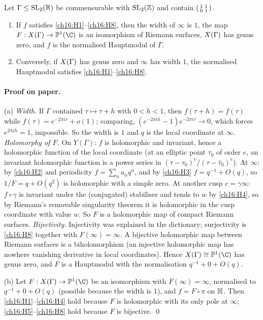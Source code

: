 \begin{proposition}\label{ch16:prop:haupt}
Let $\Gamma\le\mathrm{SL}_2(\mathbb{R})$ be commensurable with $\mathrm{SL}_2(\mathbb{Z})$ and contain $\left(\begin{smallmatrix}1&1\\0&1\end{smallmatrix}\right)$.
\begin{enumerate}[label=(\alph*)]
\item If $f$ satisfies \ref{ch16:H1}--\ref{ch16:H8}, then the width of $\infty$ is $1$, the map
  $F:\chsixteenX\to\chsixteenP(\C)$ is an isomorphism of Riemann surfaces, $X(\Gamma)$ has genus zero, and $f$ is
  the normalised Hauptmodul of $\Gamma$.
\item Conversely, if $X(\Gamma)$ has genus zero and $\infty$ has width $1$, the normalised Hauptmodul satisfies
  \ref{ch16:H1}--\ref{ch16:H8}.
\end{enumerate}
\end{proposition}
\paragraph{Proof on paper.}  (a) \emph{Width.}  If $\Gamma$ contained $\tau\mapsto\tau+h$ with $0<h<1$, then
$f(\tau+h)=f(\tau)$ while $f(\tau)=e^{-2\pi i\tau}+o(1)$; comparing, $(e^{-2\pi ih}-1)e^{-2\pi i\tau}\to0$, which
forces $e^{2\pi ih}=1$, impossible.  So the width is $1$ and $q$ is the local coordinate at $\infty$.
\emph{Holomorphy of $F$.}  On $Y(\Gamma)$: $f$ is holomorphic and invariant, hence a holomorphic function of the local
coordinate (at an elliptic point $\tau_0$ of order $e$, an invariant holomorphic function is a power series in
$(\tau-\tau_0)^e/(\tau-\bar\tau_0)^e$).  At $\infty$: by \ref{ch16:H2} and periodicity $f=\sum_n a_nq^n$, and by
\ref{ch16:H3} $f=q^{-1}+O(q)$, so $1/F=q+O(q^2)$ is holomorphic with a simple zero.  At another cusp $c=\gamma\infty$:
$f\circ\gamma$ is invariant under the (conjugated) stabiliser and tends to $w$ by \ref{ch16:H4}, so by Riemann's
removable singularity theorem it is holomorphic in the cusp coordinate with value $w$.  So $F$ is a holomorphic map of
compact Riemann surfaces.  \emph{Bijectivity.}  Injectivity was explained in the dictionary; surjectivity is
\ref{ch16:H8} together with $F(\infty)=\infty$.  A bijective holomorphic map between Riemann surfaces is a
biholomorphism (an injective holomorphic map has nowhere vanishing derivative in local coordinates).  Hence
$\chsixteenX\cong\chsixteenP(\C)$ has genus zero, and $F$ is a Hauptmodul with the normalisation $q^{-1}+0+O(q)$.

(b) Let $F:\chsixteenX\to\chsixteenP(\C)$ be an isomorphism with $F(\infty)=\infty$, normalised to $q^{-1}+0+O(q)$
(possible because the width is $1$), and $f=F\circ\pi$ on $\mathbb{H}$.  Then \ref{ch16:H1}--\ref{ch16:H4} hold
because $F$ is holomorphic with its only pole at $\infty$; \ref{ch16:H5}--\ref{ch16:H8} hold because $F$ is
bijective. \qed

